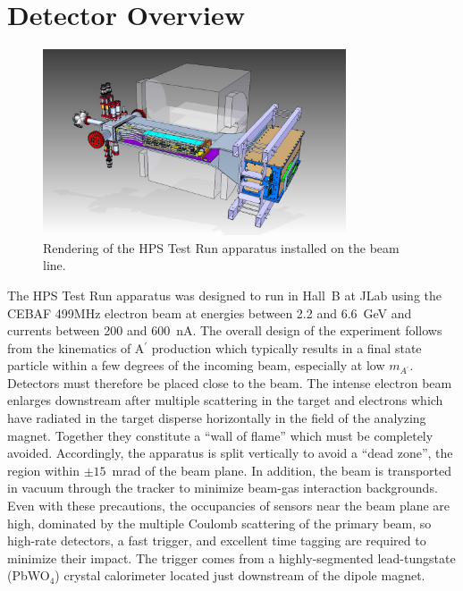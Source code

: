\documentclass[final,3p,times,twocolumn]{elsarticle}
\newcommand{\Aprime}{A\ensuremath{^\prime}}
\begin{document}
\section{Detector Overview}
\label{detector}
{\small
\begin{figure}[t]
\begin{center}
    \includegraphics[width=0.8\textwidth]{figures/hps_testrun_rendering}
\caption{Rendering of the HPS Test Run apparatus installed on the beam line.}
\label{fig:testrundetector}
\end{center}
\end{figure}
}
The HPS Test Run apparatus was designed to run in Hall~B at JLab using the CEBAF 499MHz 
electron beam at energies between 2.2 and 6.6~GeV and currents between 200 and 600~nA.  
The overall design of the experiment follows from the kinematics of \Aprime{} production which 
typically results in a final state particle within a few degrees of the incoming beam, especially at low 
$m_{\Aprime{}}$. Detectors must therefore be placed close to the beam. 
The intense electron beam enlarges downstream after multiple scattering in the target and electrons 
which have radiated in the target disperse horizontally in the field of the analyzing magnet. Together 
they constitute a ``wall of flame'' which must be completely avoided. Accordingly, 
the apparatus is split vertically to avoid a ``dead zone'', the region within $\pm 15$~mrad of the beam 
plane. In addition, the beam is transported in vacuum through the tracker to minimize beam-gas 
interaction backgrounds. Even with these precautions, the occupancies of sensors near the beam 
plane are high, dominated by the
multiple Coulomb scattering of the primary beam, so high-rate detectors, a fast trigger, 
and excellent time tagging are required to minimize their impact.  
The trigger comes from a highly-segmented  lead-tungstate (PbWO$_{4}$) crystal calorimeter located just 
downstream of the dipole magnet. 
\end{document}
